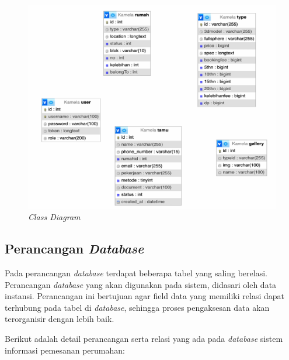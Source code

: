 \begin{figure}
    \centering
    \includegraphics[width=0.95\linewidth]{Class Diagram.png}
    \caption{\textit{Class Diagram}}
\end{figure}

\subsection{Perancangan \textit{Database}}
\par Pada perancangan \textit{database} terdapat beberapa tabel yang saling berelasi. Perancangan \textit{database} yang akan digunakan pada sistem, didasari oleh data instansi. Perancangan ini bertujuan agar field data yang memiliki relasi dapat terhubung pada tabel di \textit{database}, sehingga proses pengaksesan data akan terorganisir dengan lebih baik.

\par Berikut adalah detail perancangan serta relasi yang ada pada \textit{database} sistem informasi pemesanan perumahan:

